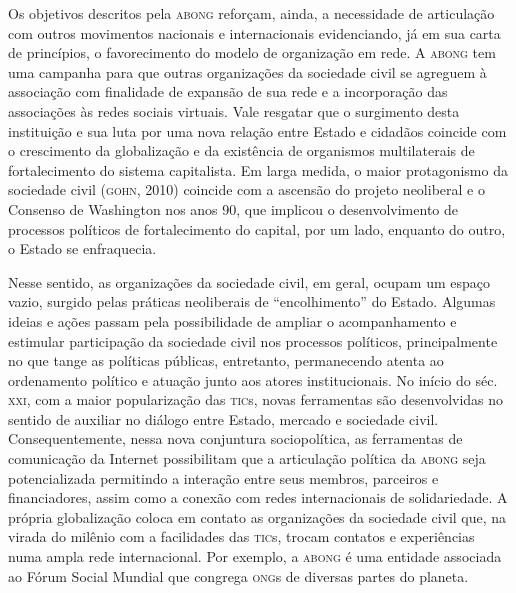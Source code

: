 Os objetivos descritos pela \textsc{abong} reforçam, ainda, a necessidade de
articulação com outros movimentos nacionais e internacionais
evidenciando, já em sua carta de princípios, o favorecimento do modelo
de organização em rede. A \textsc{abong} tem uma campanha para que outras
organizações da sociedade civil se agreguem à associação com finalidade
de expansão de sua rede e a incorporação das associações às redes
sociais virtuais. Vale resgatar que o surgimento desta instituição e sua
luta por uma nova relação entre Estado e cidadãos coincide com o
crescimento da globalização e da existência de organismos multilaterais
de fortalecimento do sistema capitalista. Em larga medida, o maior
protagonismo da sociedade civil (\textsc{gohn}, 2010) coincide com a ascensão
do projeto neoliberal e o Consenso de Washington nos anos 90, que
implicou o desenvolvimento de processos políticos de fortalecimento do
capital, por um lado, enquanto do outro, o Estado se enfraquecia.

Nesse sentido, as organizações da sociedade civil, em geral, ocupam um
espaço vazio, surgido pelas práticas neoliberais de ``encolhimento'' do
Estado. Algumas ideias e ações passam pela possibilidade de ampliar o
acompanhamento e estimular participação da sociedade civil nos processos
políticos, principalmente no que tange as políticas públicas,
entretanto, permanecendo atenta ao ordenamento político e atuação junto
aos atores institucionais. No início do séc. \textsc{xxi}, com a maior
popularização das \textsc{tic}s, novas ferramentas são desenvolvidas no sentido
de auxiliar no diálogo entre Estado, mercado e sociedade civil.
Consequentemente, nessa nova conjuntura sociopolítica, as ferramentas de
comunicação da Internet possibilitam que a articulação política da \textsc{abong}
seja potencializada permitindo a interação entre seus membros, parceiros
e financiadores, assim como a conexão com redes internacionais de
solidariedade. A própria globalização coloca em contato as organizações
da sociedade civil que, na virada do milênio com a facilidades das \textsc{tic}s,
trocam contatos e experiências numa ampla rede internacional. Por
exemplo, a \textsc{abong} é uma entidade associada ao Fórum Social Mundial que
congrega \textsc{ong}s de diversas partes do planeta.


